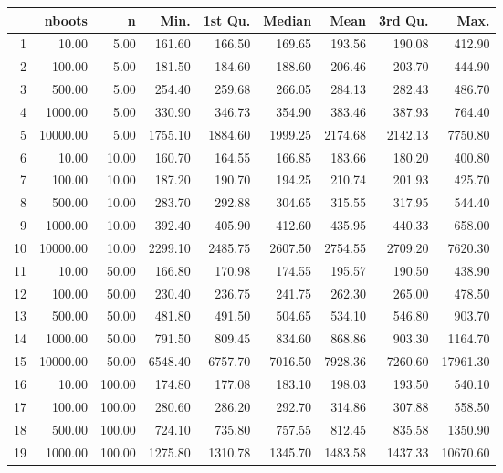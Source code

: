 \begin{table}[ht]
\centering
\begin{tabular}{rrrrrrrrr}
  \hline
 & nboots & n & Min. & 1st Qu. & Median & Mean & 3rd Qu. & Max. \\ 
  \hline
1 & 10.00 & 5.00 & 161.60 & 166.50 & 169.65 & 193.56 & 190.08 & 412.90 \\ 
  2 & 100.00 & 5.00 & 181.50 & 184.60 & 188.60 & 206.46 & 203.70 & 444.90 \\ 
  3 & 500.00 & 5.00 & 254.40 & 259.68 & 266.05 & 284.13 & 282.43 & 486.70 \\ 
  4 & 1000.00 & 5.00 & 330.90 & 346.73 & 354.90 & 383.46 & 387.93 & 764.40 \\ 
  5 & 10000.00 & 5.00 & 1755.10 & 1884.60 & 1999.25 & 2174.68 & 2142.13 & 7750.80 \\ 
  6 & 10.00 & 10.00 & 160.70 & 164.55 & 166.85 & 183.66 & 180.20 & 400.80 \\ 
  7 & 100.00 & 10.00 & 187.20 & 190.70 & 194.25 & 210.74 & 201.93 & 425.70 \\ 
  8 & 500.00 & 10.00 & 283.70 & 292.88 & 304.65 & 315.55 & 317.95 & 544.40 \\ 
  9 & 1000.00 & 10.00 & 392.40 & 405.90 & 412.60 & 435.95 & 440.33 & 658.00 \\ 
  10 & 10000.00 & 10.00 & 2299.10 & 2485.75 & 2607.50 & 2754.55 & 2709.20 & 7620.30 \\ 
  11 & 10.00 & 50.00 & 166.80 & 170.98 & 174.55 & 195.57 & 190.50 & 438.90 \\ 
  12 & 100.00 & 50.00 & 230.40 & 236.75 & 241.75 & 262.30 & 265.00 & 478.50 \\ 
  13 & 500.00 & 50.00 & 481.80 & 491.50 & 504.65 & 534.10 & 546.80 & 903.70 \\ 
  14 & 1000.00 & 50.00 & 791.50 & 809.45 & 834.60 & 868.86 & 903.30 & 1164.70 \\ 
  15 & 10000.00 & 50.00 & 6548.40 & 6757.70 & 7016.50 & 7928.36 & 7260.60 & 17961.30 \\ 
  16 & 10.00 & 100.00 & 174.80 & 177.08 & 183.10 & 198.03 & 193.50 & 540.10 \\ 
  17 & 100.00 & 100.00 & 280.60 & 286.20 & 292.70 & 314.86 & 307.88 & 558.50 \\ 
  18 & 500.00 & 100.00 & 724.10 & 735.80 & 757.55 & 812.45 & 835.58 & 1350.90 \\ 
  19 & 1000.00 & 100.00 & 1275.80 & 1310.78 & 1345.70 & 1483.58 & 1437.33 & 10670.60 \\ 

\end{tabular}
\end{table}
